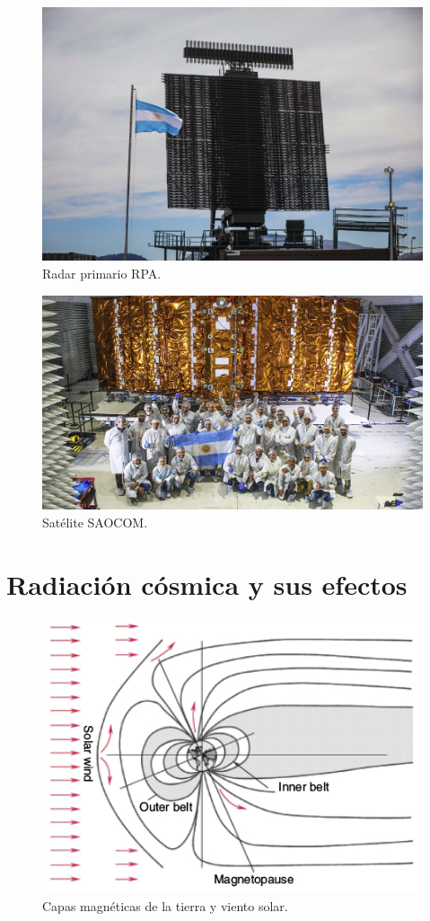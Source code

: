 \begin{figure}[htbp]
	\centering
	\includegraphics[width=.8\textwidth]{./Figures/invaprpa.jpg}
	\caption{Radar primario RPA\citep{WEBSITE:invap}.}
	\label{fig:rpa}
\end{figure}

\begin{figure}[htbp]
	\centering
	\includegraphics[width=.8\textwidth]{./Figures/invapsaocom.jpg}
	\caption{Satélite SAOCOM\citep{WEBSITE:invap}.}
	\label{fig:saocom}
\end{figure}

\section{Radiación cósmica y sus efectos}
\label{sec:radiacion}

\begin{figure}[htbp]
	\centering
	\includegraphics[width=.8\textwidth]{./Figures/vientosolar.jpg}
    \caption{Capas magnéticas de la tierra y viento solar\citep{WEBSITE:structure_space_radiation}.}
	\label{fig:viento}
\end{figure}

